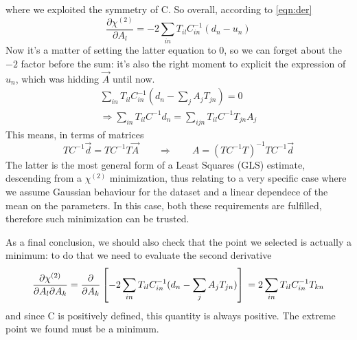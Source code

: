 \documentclass[a4paper,11pt,fleqn]{article}
\begin{document}
where we exploited the symmetry of C. So overall, according to \ref{eqn:der}
\begin{equation*}
    \frac{\partial \chi^{(2)}}{\partial A_l} = -2 \sum_{in}T_{il}C^{-1}_{in}(d_n-u_n)
\end{equation*}
Now it's a matter of setting the latter equation to 0, so we can forget about 
the $-2$ factor before the sum: it's also the right 
moment to explicit the expression of $u_n$, which was hidding $\vec{A}$
until now.
\begin{gather*}
    \sum_{in}T_{il}C^{-1}_{in}(d_n-\sum_j A_j T_{jn}) = 0 \\
    \Rightarrow \sum_{in}T_{il}C^{-1}d_n = \sum_{ijn}T_{il}C^{-1}T_{jn}A_j
\end{gather*}
This means, in terms of matrices
\begin{equation}
    \label{eqn:GLS}
    TC^{-1}\vec{d}=TC^{-1}T\vec{A} \qquad \Rightarrow \qquad A = (TC^{-1}T)^{-1}TC^{-1}\vec{d}
\end{equation}
The latter is the most general form of a Least Squares (GLS) estimate, 
descending from a $\chi^{(2)}$ minimization, thus relating to a very specific 
case where we assume Gaussian behaviour for the dataset and a linear dependece 
of the mean on the parameters. In this case, both these requirements are 
fulfilled, therefore such minimization can be trusted.

\medskip

As a final conclusion, we should also check that the point we selected is actually a minimum: to 
do that we need to evaluate the second derivative 
\begin{equation*}
    \frac{\partial \chi^{(2)}}{\partial A_l \partial A_k} = \frac{\partial}{\partial A_k}\left[-2 \sum_{in}T_{il}C^{-1}_{in}(d_n-\sum_j A_j T_{jn})\right]\\ 
    = 2\sum_{in}T_{il}C^{-1}_{in}T_{kn}
\end{equation*}
and since C is positively defined, this quantity is always positive. The 
extreme point we found must be a minimum.
\end{document}

